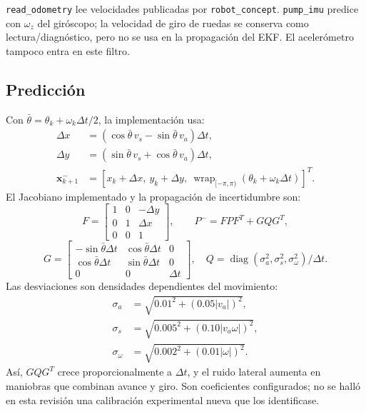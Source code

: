 \documentclass[11pt,a4paper]{article}
\newcommand{\code}[1]{\nolinkurl{#1}}
\newcommand{\wrap}{\operatorname{wrap}_{[-\pi,\pi)}}
\begin{document}
\code{read_odometry} lee velocidades publicadas por \code{robot_concept}.
\code{pump_imu} predice con $\omega_z$ del giróscopo; la velocidad de giro de ruedas
se conserva como lectura/diagnóstico, pero no se usa en la propagación del EKF.
El acelerómetro tampoco entra en este filtro.~\cite{openworker,robotworker}

\subsection{Predicción}
Con $\bar\theta=\theta_k+\omega_k\Delta t/2$, la implementación usa:
\begin{align}
 \Delta x&=(\cos\bar\theta\,v_s-\sin\bar\theta\,v_a)\Delta t,\\
 \Delta y&=(\sin\bar\theta\,v_s+\cos\bar\theta\,v_a)\Delta t,\\
 \bm{x}_{k+1}^{-}&=[x_k+\Delta x,\ y_k+\Delta y,\ \wrap(\theta_k+\omega_k\Delta t)]^T.
\end{align}
El Jacobiano implementado y la propagación de incertidumbre son:
\begin{equation}
 F=\begin{bmatrix}1&0&-\Delta y\\0&1&\Delta x\\0&0&1\end{bmatrix},
 \qquad P^- = FPF^T+GQG^T,
\end{equation}
\begin{equation}
 G=\begin{bmatrix}
 -\sin\bar\theta\Delta t&\cos\bar\theta\Delta t&0\\
 \cos\bar\theta\Delta t&\sin\bar\theta\Delta t&0\\
 0&0&\Delta t
 \end{bmatrix},\quad
 Q=\operatorname{diag}(\sigma_a^2,\sigma_s^2,\sigma_\omega^2)/\Delta t.
\end{equation}
Las desviaciones son densidades dependientes del movimiento:
\begin{align}
 \sigma_a&=\sqrt{0.01^2+(0.05|v_a|)^2},\\
 \sigma_s&=\sqrt{0.005^2+(0.10|v_a\omega|)^2},\\
 \sigma_\omega&=\sqrt{0.002^2+(0.01|\omega|)^2}.
\end{align}
Así, $GQG^T$ crece proporcionalmente a $\Delta t$, y el ruido lateral aumenta en
maniobras que combinan avance y giro. Son coeficientes configurados; no se halló en
esta revisión una calibración experimental nueva que los identificase.~\cite{ekf,openconfig}
\end{document}
